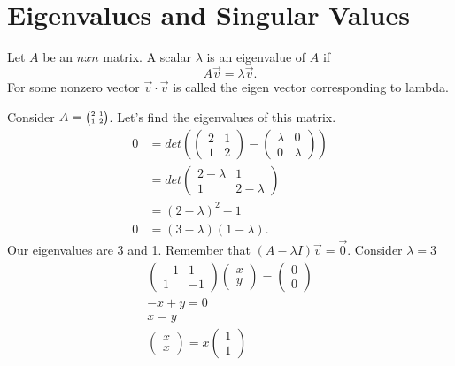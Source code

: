 \section{Eigenvalues and Singular Values}

\begin{definition}
  Let $A$ be an $nxn$ matrix. A scalar $\lambda$ is an eigenvalue of $A$ if 
  \[
  A\vec{v}=\lambda\vec{v}
  .\] 
  For some nonzero vector $\vec{v}\cdot\vec{v}$ is called the eigen vector corresponding to lambda.
\end{definition}
\begin{eg}
  Consider $A=\SmallMatrix{2&1\\1&2}$. Let's find the eigenvalues of this matrix.
    \begin{align*}
    0 &= det\left( \begin{pmatrix}2&1\\1&2\end{pmatrix}-\begin{pmatrix}\lambda&0\\0&\lambda\end{pmatrix}\right) \\
      &=det\begin{pmatrix} 2-\lambda&1\\1&2-\lambda \end{pmatrix} \\
      &=(2-\lambda)^2-1\\
    0&=(3-\lambda)(1-\lambda).
    \end{align*}
  Our eigenvalues are 3 and 1. Remember that $(A-\lambda I)\vec{v}=\vec{0}$. Consider $\lambda = 3$
  \begin{align*}
    \begin{pmatrix} -1&1\\1&-1 \end{pmatrix} \begin{pmatrix} x\\y \end{pmatrix} =\begin{pmatrix} 0\\0 \end{pmatrix} \\
    -x+y=0\\
    x=y\\
    \begin{pmatrix} x\\x \end{pmatrix} =x\begin{pmatrix} 1\\1 \end{pmatrix} 

\end{align*}
\end{eg}
